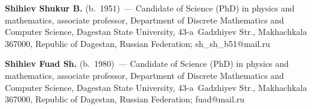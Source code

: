 

\Contr

\noindent
\textbf{Shihiev Shukur B.} (b.\ 1951)~--- Candidate of Science (PhD) in physics and 
mathematics, associate professor, Department of Discrete Mathematics and Computer 
Science, Dagestan State University, 43-a~Gadzhiyev Str., Makhachkala 367000, Republic of 
Dagestan, Russian Federation; \mbox{sh\_sh\_b51@mail.ru}

\vspace*{3pt}

\noindent
\textbf{Shihiev Fuad Sh.} (b.\ 1980)~--- Candidate of Science (PhD) in physics and 
mathematics, associate professor, Department of Discrete Mathematics and Computer 
Science, Dagestan State University, 43-a~Gadzhiyev Str., Makhachkala 367000, Republic of 
Dagestan, Russian Federation; \mbox{fuad@mail.ru}



\label{end\stat}

\renewcommand{\bibname}{\protect\rm Литература} 